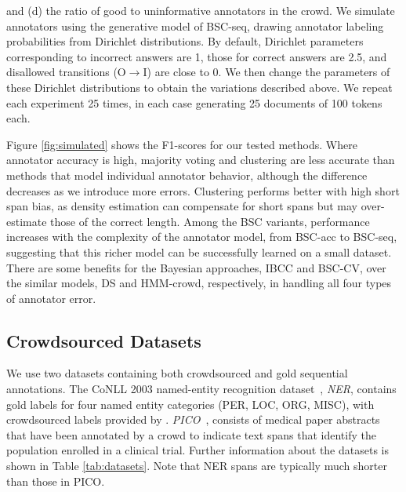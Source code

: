 and (d) the ratio of good to uninformative annotators in the crowd.
We simulate annotators using the generative model of BSC-seq, 
drawing annotator labeling probabilities from Dirichlet distributions. 
By default, Dirichlet parameters corresponding to incorrect answers are 1,
those for correct answers are 2.5, and disallowed transitions (O$\rightarrow$I) are close to 0. 
We then change the parameters of these Dirichlet distributions 
to obtain the variations described above. 
We repeat each experiment 25 times, in each case generating 25 documents of 100 tokens each. 

Figure \ref{fig:simulated} shows the F1-scores for our tested methods. 
Where annotator accuracy is high, majority voting and clustering are less accurate than  methods that model individual annotator behavior, although the difference decreases as we introduce more errors.
Clustering performs better with high short span bias, 
as density estimation can compensate for short spans but may over-estimate
those of the correct length.
Among the BSC variants, performance increases with the complexity of the annotator model, from BSC-acc to BSC-seq,
suggesting that this richer model can be successfully learned on a small dataset. 
There are some benefits for the Bayesian approaches, IBCC and BSC-CV, over the similar  models, DS and HMM-crowd, respectively, in handling all four types of annotator error.

\subsection{Crowdsourced Datasets}\label{sec:expts}

We use two datasets containing both crowdsourced and gold sequential annotations. 
The CoNLL 2003 named-entity recognition dataset~\cite{tjong2003introduction},
\emph{NER}, contains gold labels for four named entity categories (PER, LOC, ORG, MISC),
with crowdsourced labels provided by \cite{rodrigues2014sequence}.
\emph{PICO}~\cite{nguyen2017aggregating}, 
consists of medical paper abstracts that have been annotated by a crowd to indicate text spans that identify the population enrolled in a clinical trial. 
Further information about the datasets is shown in Table \ref{tab:datasets}. Note that NER spans are typically much shorter than those in PICO.

